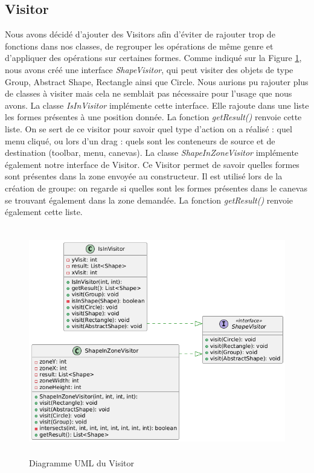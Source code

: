 \documentclass{article}
\begin{document}
\subsection{Visitor}
Nous avons décidé d'ajouter des Visitors afin d'éviter de rajouter trop de fonctions dans nos classes,
de regrouper les opérations de même genre et d'appliquer des opérations sur certaines formes.
Comme indiqué sur la Figure \ref{Visitor}, nous avons créé une interface \textit{ShapeVisitor}, qui
peut visiter des objets de type Group, Abstract Shape, Rectangle ainsi que Circle. Nous aurions pu rajouter plus de classes à
visiter mais cela ne semblait pas nécessaire pour l'usage que nous avons.
La classe \textit{IsInVisitor} implémente cette interface. Elle rajoute dans une liste les formes présentes à une position donnée.
La fonction \textit{getResult()} renvoie cette liste.
On se sert de ce visitor pour savoir quel type d'action on a réalisé : quel menu cliqué, ou lors d'un drag : quels sont les
conteneurs de source et de destination (toolbar, menu, canevas).
La classe \textit{ShapeInZoneVisitor} implémente également notre interface de Visitor.
Ce Visitor permet de savoir quelles formes sont présentes dans la zone envoyée au constructeur. Il est utilisé lors de la création de groupe:
on regarde si quelles sont les formes présentes dans le canevas se trouvant également dans la zone demandée.
La fonction \textit{getResult()} renvoie également cette liste.
\begin{figure}[h]
    \centering
    \includegraphics[width=\textwidth,height=10.0cm,keepaspectratio]{visitor.png}
    \caption{Diagramme UML du Visitor}
    \label{Visitor}
\end{figure}
\FloatBarrier
\end{document}
